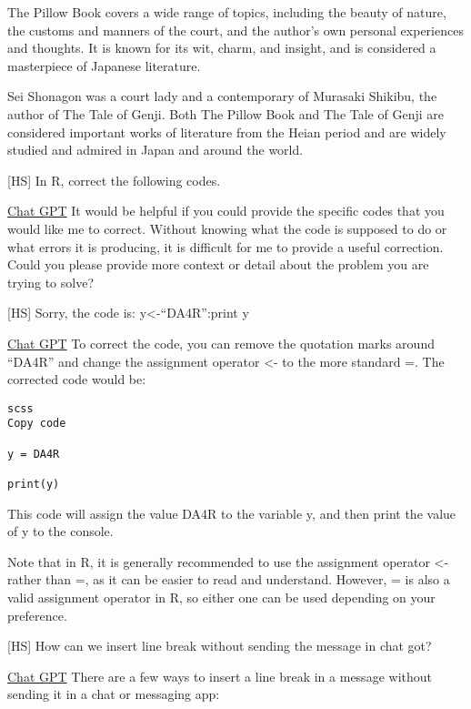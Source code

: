 \documentclass[
]{book}
\theoremstyle{definition}
\theoremstyle{definition}
\theoremstyle{definition}
\theoremstyle{definition}
\theoremstyle{remark}
\begin{document}
The Pillow Book covers a wide range of topics, including the beauty of nature, the customs and manners of the court, and the author's own personal experiences and thoughts. It is known for its wit, charm, and insight, and is considered a masterpiece of Japanese literature.

Sei Shonagon was a court lady and a contemporary of Murasaki Shikibu, the author of The Tale of Genji. Both The Pillow Book and The Tale of Genji are considered important works of literature from the Heian period and are widely studied and admired in Japan and around the world.

{[}HS{]} In R, correct the following codes.

\protect\hyperlink{chatgpt}{Chat GPT} It would be helpful if you could provide the specific codes that you would like me to correct. Without knowing what the code is supposed to do or what errors it is producing, it is difficult for me to provide a useful correction. Could you please provide more context or detail about the problem you are trying to solve?

{[}HS{]} Sorry, the code is: y\textless-``DA4R'':print y

\protect\hyperlink{chatgpt}{Chat GPT} To correct the code, you can remove the quotation marks around ``DA4R'' and change the assignment operator \textless- to the more standard =. The corrected code would be:

\begin{verbatim}
scss
Copy code

y = DA4R

print(y)
\end{verbatim}

This code will assign the value DA4R to the variable y, and then print the value of y to the console.

Note that in R, it is generally recommended to use the assignment operator \textless- rather than =, as it can be easier to read and understand. However, = is also a valid assignment operator in R, so either one can be used depending on your preference.

{[}HS{]} How can we insert line break without sending the message in chat got?

\protect\hyperlink{chatgpt}{Chat GPT} There are a few ways to insert a line break in a message without sending it in a chat or messaging app:
\end{document}

